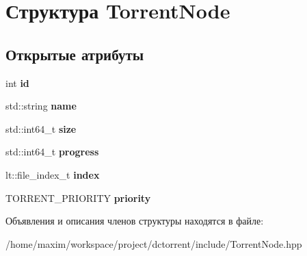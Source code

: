 \hypertarget{struct_torrent_node}{}\section{Структура Torrent\+Node}
\label{struct_torrent_node}
\subsection*{Открытые атрибуты}
\begin{DoxyCompactItemize}
\item 
\mbox{\label{struct_torrent_node_ab597f6244ad00fb272b888193ae42778}} 
int {\bfseries id}
\item 
\mbox{\label{struct_torrent_node_ab2e391a056ba40ac6f7d3912018a38fd}} 
std\+::string {\bfseries name}
\item 
\mbox{\label{struct_torrent_node_a5bdc2c7db542ae99d2138c11c5b0a366}} 
std\+::int64\+\_\+t {\bfseries size}
\item 
\mbox{\label{struct_torrent_node_a28b3ccc9020bccb339a258cb261fcfbe}} 
std\+::int64\+\_\+t {\bfseries progress}
\item 
\mbox{\label{struct_torrent_node_acf0a7ca9173fe84bb9ccd6b50340fd18}} 
lt\+::file\+\_\+index\+\_\+t {\bfseries index}
\item 
\mbox{\label{struct_torrent_node_a20339f0e65138efb21c95b41a0717be7}} 
T\+O\+R\+R\+E\+N\+T\+\_\+\+P\+R\+I\+O\+R\+I\+TY {\bfseries priority}
\end{DoxyCompactItemize}


Объявления и описания членов структуры находятся в файле\+:\begin{DoxyCompactItemize}
\item 
/home/maxim/workspace/project/dctorrent/include/Torrent\+Node.\+hpp\end{DoxyCompactItemize}
